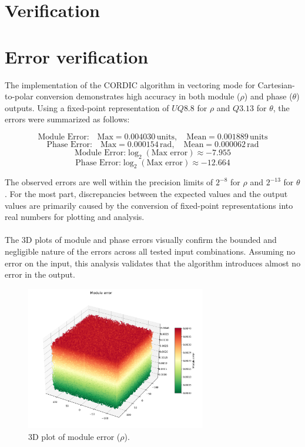 \begin{code}
    \inputminted{vhdl}{../vhdl/tb/GRAPH_tb.vhd}
    \label{code:testbench_graph}
\end{code}

\section{Verification}

\section{Error verification}
The implementation of the CORDIC algorithm in vectoring mode for Cartesian-to-polar conversion demonstrates 
high accuracy in both module (\( \rho \)) and phase (\( \theta \)) outputs. Using a fixed-point 
representation of \( UQ8.8 \) for \( \rho \) and \( Q3.13 \) for \( \theta \), the errors were summarized as follows:

\[
\text{Module Error:} \quad \text{Max} = 0.004030 \, \text{units}, \quad \text{Mean} = 0.001889 \, \text{units}
\]
\[
\text{Phase Error:} \quad \text{Max} = 0.000154 \, \text{rad}, \quad \text{Mean} = 0.000062 \, \text{rad}
\]
\[
    \text{Module Error:} \log_2(\text{Max error}) \approx -7.955
\]
\[
    \text{Phase Error:} \log_2(\text{Max error}) \approx -12.664
\]

The observed errors are well within the precision limits of \( 2^{-8} \) for \( \rho \) and \( 2^{-13} \) for \( \theta \). For the most part, discrepancies between the expected values and the output values are primarily caused by the conversion of fixed-point representations into real numbers for plotting and analysis.
\\\\
The 3D plots of module and phase errors visually confirm the bounded and negligible nature of the errors across 
all tested input combinations. Assuming no error on the input, this analysis validates that the algorithm introduces 
almost no error in the output.

\begin{figure}[H]
    \centering
    \includegraphics[width=0.7\textwidth]{./images/Verification/module_error.png}
    \caption{3D plot of module error (\( \rho \)).}
    \label{fig:module_error}
\end{figure}

